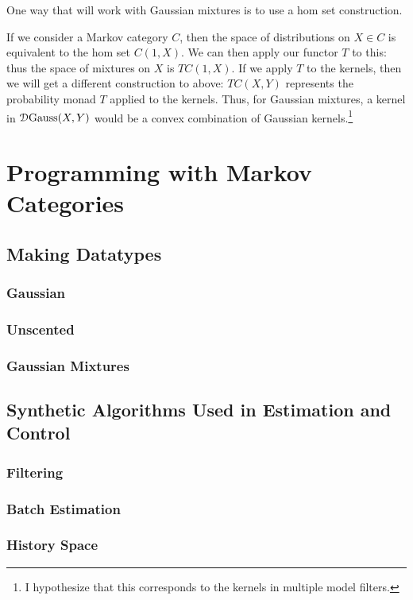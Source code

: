 One way that will work with Gaussian mixtures is to use a hom set construction.

If we consider a Markov category $C$, then the space of distributions on $X\in C$ is equivalent to the hom set $C(1,X)$.
We can then apply our functor $T$ to this: thus the space of mixtures on $X$ is $TC(1,X)$.
If we apply $T$ to the kernels, then we will get a different construction to above: $TC(X,Y)$ represents the probability monad $T$ applied to the kernels.
Thus, for Gaussian mixtures, a kernel in $\mathcal{D} \mathrm{Gauss}(X,Y)$ would be a convex combination of Gaussian kernels.\footnote{I hypothesize that this corresponds to the kernels in multiple model filters.}



\chapter{Programming with Markov Categories}
\section{Making Datatypes}
\subsection{Gaussian}
\subsection{Unscented}
\subsection{Gaussian Mixtures}


\section{Synthetic Algorithms Used in Estimation and Control}
\subsection{Filtering}
\subsection{Batch Estimation}
\subsection{History Space}
